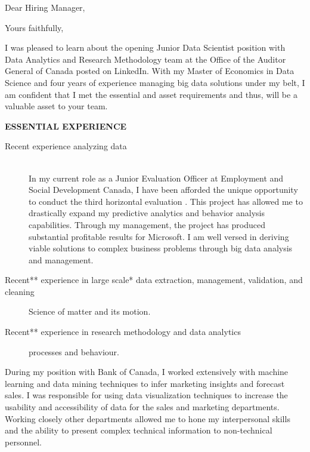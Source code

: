 
\date{\today}
\opening{Dear Hiring Manager,}
\closing{Yours faithfully,}




\makelettertitle

I was pleased to learn about the opening Junior Data Scientist position with Data Analytics and Research Methodology team at the Office of the Auditor General of Canada posted on LinkedIn. With my Master of Economics in Data Science and four years of experience managing big data solutions under my belt, I am confident that I met the essential and asset requirements and thus, will be a valuable asset to your team.

\bigskip
\textbf{ESSENTIAL EXPERIENCE\\}
\bigskip
\begin{description}
\item[Recent experience analyzing data] \hfill \\ 
In my current role as a Junior Evaluation Officer at Employment and Social Development Canada, I have been afforded the unique opportunity to conduct the third horizontal evaluation . This project has allowed me to drastically expand my predictive analytics and behavior analysis capabilities. Through my management, the project has produced substantial profitable results for Microsoft. I am well versed in deriving viable solutions to complex business problems through big data analysis and management.

\medskip
\item[Recent** experience in large scale* data extraction, management, validation, and cleaning] \hfill 
Science of matter and its motion.
\medskip
\item[Recent** experience in research methodology and data analytics] \hfill 
processes and behaviour.
\medskip

\end{description}



During my position with Bank of Canada, I worked extensively with machine learning and data mining techniques to infer marketing insights and forecast sales. I was responsible for using data visualization techniques to increase the usability and accessibility of data for the sales and marketing departments. Working closely other departments allowed me to hone my interpersonal skills and the ability to present complex technical information to non-technical personnel.

